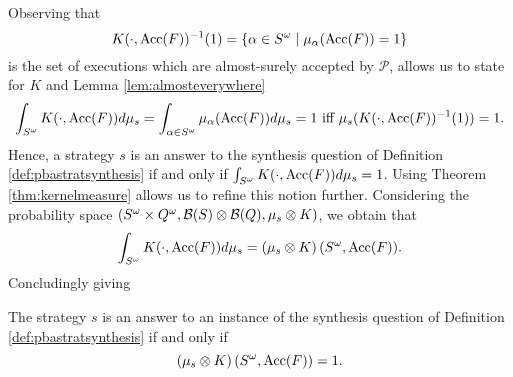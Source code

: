 Observing that
\begin{equation*}
  K(\cdot,\operatorname{Acc}(F))^{-1}(1) = \left\{
    \alpha\in S^{\omega}\mid\mu_{\alpha}(\operatorname{Acc}(F)) = 1
  \right\}
\end{equation*}
is the set of executions which are almost-surely accepted by $\mathcal{P}$,
allows us to state for $K$ and Lemma \ref{lem:almosteverywhere}
\begin{equation*}
  \int_{S^{\omega}}K(\cdot, \operatorname{Acc}(F)) d\mu_{s}
  = \int_{\alpha\in S^{\omega}}\mu_{\alpha}(\operatorname{Acc}(F))d\mu_{s} = 1 \text{ iff }
    \mu_{s}(K(\cdot,\operatorname{Acc}(F))^{-1}(1)) = 1.
\end{equation*}
Hence, a strategy $s$ is an answer to the synthesis question of Definition
\ref{def:pbastratsynthesis} if and only if
$\int_{S^{\omega}}K(\cdot, \operatorname{Acc}(F)) d\mu_{s} = 1$.
Using Theorem \ref{thm:kernelmeasure} allows us to refine this notion further.
Considering the probability space $\left(S^{\omega}\times Q^{\omega},
\mathcal{B}(S)\otimes\mathcal{B}(Q), \mu_{s}\otimes K\right)$, we obtain that
\begin{equation*}
  \int_{S^{\omega}}K(\cdot, \operatorname{Acc}(F)) d\mu_{s} = 
    \left(\mu_{s}\otimes K\right)(S^{\omega}, \operatorname{Acc}(F)).
\end{equation*}
Concludingly giving
\begin{lemma}
  The strategy $s$ is an answer to an instance of the synthesis question of
  Definition \ref{def:pbastratsynthesis} if and only if
  \begin{equation*}
    \left(\mu_{s}\otimes K\right)(S^{\omega}, \operatorname{Acc}(F)) = 1.
  \end{equation*}
  \label{lem:pbysynthesisbymuK}
\end{lemma}

